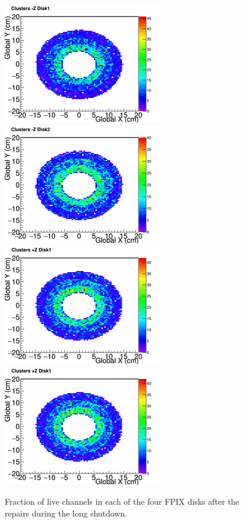 \begin{figure}[hbtp]
  \begin{center}
    \includegraphics[width=1.0\cmsFigWidth]{figures/FPIX-d1-mz-after}
    \includegraphics[width=1.0\cmsFigWidth]{figures/FPIX-d2-mz-after}
    \includegraphics[width=1.0\cmsFigWidth]{figures/FPIX-d1-pz-after}
    \includegraphics[width=1.0\cmsFigWidth]{figures/FPIX-d1-pz-after}
    \caption{Fraction of live channels in each of the four FPIX disks after the repairs during the long shutdown.}
    \label{fig:fpix-live-before}
  \end{center}
\end{figure}


